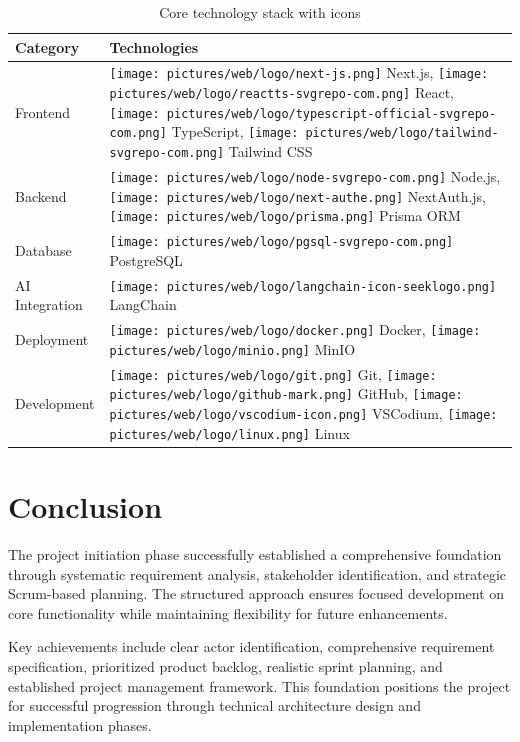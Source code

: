 \begin{table}[H]
    \centering
    \begin{tabular}{|p{3cm}|p{8cm}|}
        \hline
        \textbf{Category} & \textbf{Technologies} \\ \hline
        
         Frontend & 
        \texttt{[image: pictures/web/logo/next-js.png]} Next.js, 
        \texttt{[image: pictures/web/logo/reactts-svgrepo-com.png]} React, 
        \texttt{[image: pictures/web/logo/typescript-official-svgrepo-com.png]} TypeScript, \newline
        \texttt{[image: pictures/web/logo/tailwind-svgrepo-com.png]} Tailwind CSS \\ \hline
        
         Backend & 
        \texttt{[image: pictures/web/logo/node-svgrepo-com.png]} Node.js, 
        \texttt{[image: pictures/web/logo/next-authe.png]} NextAuth.js, \newline
        \texttt{[image: pictures/web/logo/prisma.png]} Prisma ORM \\ \hline
        
         Database & 
        \texttt{[image: pictures/web/logo/pgsql-svgrepo-com.png]} PostgreSQL \\ \hline
        
         AI Integration & 
        \texttt{[image: pictures/web/logo/langchain-icon-seeklogo.png]} LangChain \\ \hline
        
         Deployment & 
        \texttt{[image: pictures/web/logo/docker.png]} Docker, 
        \texttt{[image: pictures/web/logo/minio.png]} MinIO \\ \hline
        
         Development & 
        \texttt{[image: pictures/web/logo/git.png]} Git, 
        \texttt{[image: pictures/web/logo/github-mark.png]} GitHub, 
        \texttt{[image: pictures/web/logo/vscodium-icon.png]} VSCodium, \newline
        \texttt{[image: pictures/web/logo/linux.png]} Linux \\ \hline
    \end{tabular}
    \caption{Core technology stack with icons}
\end{table}

\section{Conclusion}

The project initiation phase successfully established a comprehensive foundation through systematic requirement analysis, stakeholder identification, and strategic Scrum-based planning. The structured approach ensures focused development on core functionality while maintaining flexibility for future enhancements.

Key achievements include clear actor identification, comprehensive requirement specification, prioritized product backlog, realistic sprint planning, and established project management framework. This foundation positions the project for successful progression through technical architecture design and implementation phases.